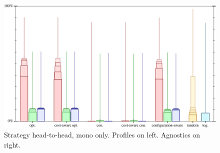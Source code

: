 \begin{figure}[t]
  \includegraphics[width=\columnwidth]{data/strategy-overall.pdf}
  \caption{Strategy head-to-head, mono only. Profiles on left. Agnostics on right.}
  \label{f:strategy-overall}
\end{figure}

\clearpage


